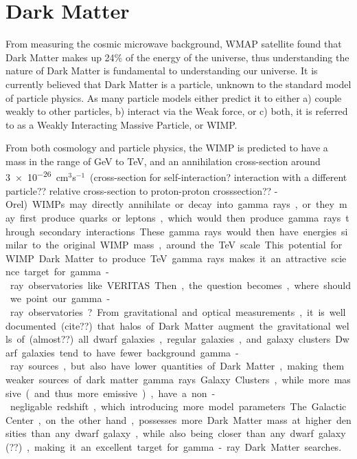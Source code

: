 \section{Dark Matter}

  From measuring the cosmic microwave background, WMAP satellite found that Dark Matter makes up 24\% of the energy of the universe\cite{pdg_2012}, thus understanding the nature of Dark Matter is fundamental to understanding our universe.
  It is currently believed that Dark Matter is a particle, unknown to the standard model of particle physics.
  As many particle models either predict it to either a) couple weakly to other particles, b) interact via the Weak force, or c) both, it is referred to as a Weakly Interacting Massive Particle, or WIMP.

  From both cosmology and particle physics, the WIMP is predicted to have a mass in the range of GeV to TeV, and an annihilation cross-section around \nicetilde{}\SI{3e-26}{cm${}^3$s${}^{-1}$} {\color{red}(cross-section for self-interaction? interaction with a different particle?? relative cross-section to proton-proton crosssection?? -Orel)}.
  WIMPs may directly annihilate or decay into gamma rays, or they may first produce quarks or leptons, which would then produce gamma rays through secondary interactions.
  These gamma rays would then have energies similar to the original WIMP mass, around the TeV scale.
  This potential for WIMP Dark Matter to produce TeV gamma rays makes it an attractive science target for gamma-ray observatories like VERITAS.

  Then, the question becomes, where should we point our gamma-ray observatories?
  From gravitational and optical measurements, it is well documented {\color{red}(cite??)} that halos of Dark Matter augment the gravitational wells of {\color{red}(almost??)} all dwarf galaxies, regular galaxies, and galaxy clusters.
  Dwarf galaxies tend to have fewer background gamma-ray sources, but also have lower quantities of Dark Matter, making them weaker sources of dark matter gamma rays.
  Galaxy Clusters, while more massive (and thus more emissive), have a non-negligable redshift, which introducing more model parameters.
  The Galactic Center, on the other hand, possesses more Dark Matter mass at higher densities than any dwarf galaxy, while also being closer than any dwarf galaxy {\color{red}(??)}, making it an excellent target for gamma-ray Dark Matter searches.


